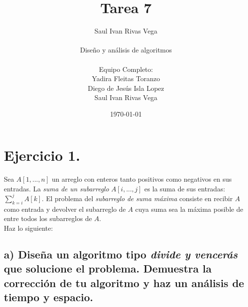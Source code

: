 \documentclass[12pt]{article}
\title{Tarea 7}
\author{
	Saul Ivan Rivas Vega \\
	\\
	Diseño y análisis de algoritmos\\
\\
	Equipo Completo:\\
		Yadira Fleitas Toranzo\\
		Diego de Jesús Isla Lopez\\
		Saul Ivan Rivas Vega\\
}
\date{\today}
\begin{document}
	\maketitle
	\pagebreak
	\section{Ejercicio 1.}
	  \paragraph{} Sea $A[1,...,n]$ un arreglo con enteros tanto positivos como negativos en sus entradas. La \textit{suma de un subarreglo} $A[i,...,j]$ es la suma de sus entradas: $\sum_{k=i}^{j}A[k]$. El problema del \textit{subarreglo de suma máxima} consiste en recibir $A$ como entrada y devolver el subarreglo de $A$ cuya suma sea la máxima posible de entre todos los subarreglos de $A$.
	  \\
	  Haz lo siguiente:
	  \\
	 \subsection{a) Diseña un algoritmo tipo \textit{divide y vencerás} que solucione el problema. Demuestra la corrección de tu algoritmo y haz un análisis de tiempo y espacio.} 
\end{document}
